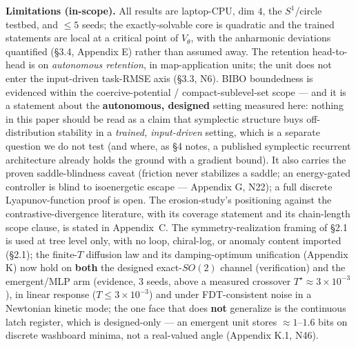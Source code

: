 \documentclass[10pt]{article}
\begin{document}
\textbf{Limitations (in-scope).} All results are laptop-CPU, dim $4$, the $S^1$/circle testbed, and $\le5$ seeds; the exactly-solvable core is quadratic and the trained statements are local at a critical point of $V_\theta$, with the anharmonic deviations quantified (\S3.4, Appendix E) rather than assumed away. The retention head-to-head is on \emph{autonomous retention}, in map-application units; the unit does not enter the input-driven task-RMSE axis (\S3.3, N6). BIBO boundedness is evidenced within the coercive-potential / compact-sublevel-set scope --- and it is a statement about the \textbf{autonomous, designed} setting measured here: nothing in this paper should be read as a claim that symplectic structure buys off-distribution stability in a \emph{trained, input-driven} setting, which is a separate question we do not test (and where, as \S4 notes, a published symplectic recurrent architecture already holds the ground with a gradient bound). It also carries the proven saddle-blindness caveat (friction never stabilizes a saddle; an energy-gated controller is blind to isoenergetic escape --- Appendix G, N22); a full discrete Lyapunov-function proof is open. The erosion-study's positioning against the contrastive-divergence literature, with its coverage statement and its chain-length scope clause, is stated in Appendix~C. The symmetry-realization framing of \S2.1 is used at tree level only, with no loop, chiral-log, or anomaly content imported (\S2.1); the finite-$T$ diffusion law and its damping-optimum unification (Appendix K) now hold on \textbf{both} the designed exact-$SO(2)$ channel (verification) and the emergent/MLP arm (evidence, $3$ seeds, above a measured crossover $T^\star\approx3\!\times\!10^{-3}$), in linear response ($T\le3\!\times\!10^{-3}$) and under FDT-consistent noise in a Newtonian kinetic mode; the one face that does \textbf{not} generalize is the continuous latch register, which is designed-only --- an emergent unit stores $\approx1$--$1.6$ bits on discrete washboard minima, not a real-valued angle (Appendix K.1, N46).
\end{document}
